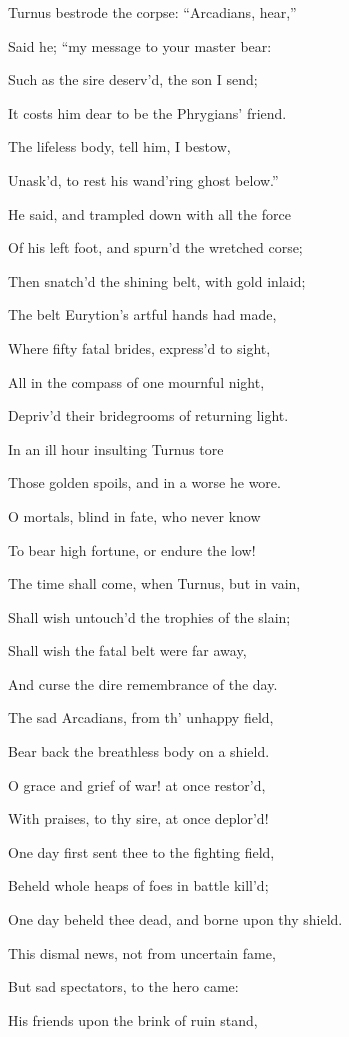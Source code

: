 Turnus bestrode the corpse: “Arcadians, hear,”

Said he; “my message to your master bear:

Such as the sire deserv’d, the son I send;

It costs him dear to be the Phrygians’ friend.

The lifeless body, tell him, I bestow,

Unask’d, to rest his wand’ring ghost below.”

He said, and trampled down with all the force

Of his left foot, and spurn’d the wretched corse;

Then snatch’d the shining belt, with gold inlaid;

The belt Eurytion’s artful hands had made,

Where fifty fatal brides, express’d to sight,

All in the compass of one mournful night,

Depriv’d their bridegrooms of returning light.

In an ill hour insulting Turnus tore

Those golden spoils, and in a worse he wore.

O mortals, blind in fate, who never know

To bear high fortune, or endure the low!

The time shall come, when Turnus, but in vain,

Shall wish untouch’d the trophies of the slain;

Shall wish the fatal belt were far away,

And curse the dire remembrance of the day.

The sad Arcadians, from th’ unhappy field,

Bear back the breathless body on a shield.

O grace and grief of war! at once restor’d,

With praises, to thy sire, at once deplor’d!

One day first sent thee to the fighting field,

Beheld whole heaps of foes in battle kill’d;

One day beheld thee dead, and borne upon thy shield.

This dismal news, not from uncertain fame,

But sad spectators, to the hero came:

His friends upon the brink of ruin stand,

